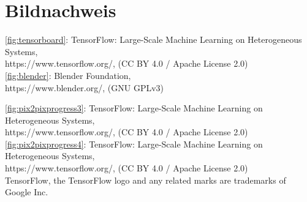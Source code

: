 \chapter*{Bildnachweis}


\autoref{fig:tensorboard}: {TensorFlow}: Large-Scale Machine Learning on Heterogeneous Systems,\\
https://www.tensorflow.org/, (CC BY 4.0 / Apache License 2.0) \\

\noindent
\autoref{fig:blender}: Blender Foundation,\\
https://www.blender.org/, (GNU GPLv3)

\noindent
\autoref{fig:pix2pixprogress3}: {TensorFlow}: Large-Scale Machine Learning on Heterogeneous Systems,\\
https://www.tensorflow.org/, (CC BY 4.0 / Apache License 2.0) \\

\noindent
\autoref{fig:pix2pixprogress4}: {TensorFlow}: Large-Scale Machine Learning on Heterogeneous Systems,\\
https://www.tensorflow.org/, (CC BY 4.0 / Apache License 2.0) \\

\noindent
TensorFlow, the TensorFlow logo and any related marks are trademarks of Google Inc.

